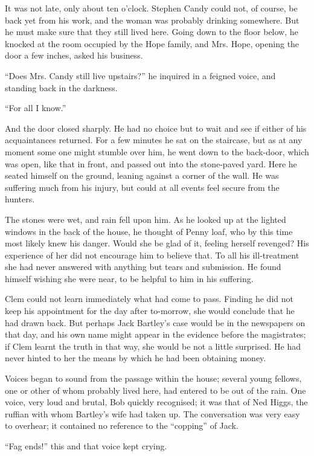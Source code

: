 It was not late, only about ten o'clock. Stephen Candy could not, of
course, be back yet from his work, and the woman was probably drinking
somewhere. But he must make sure that they still lived here. Going down
to the floor below, he knocked at the room occupied by the Hope family,
and Mrs. Hope, opening the door a few inches, asked his business.

``Does Mrs. Candy still live upstairs?'' he inquired in a feigned voice,
and standing back in the darkness.

{}``For all I know.''

And the door closed sharply. He had no choice but to wait and see if
either of his acquaintances returned. For a few minutes he sat on the
staircase, but as at any moment some one might stumble over him, he went
down to the back-door, which was open, like that in front, and passed
out into the stone-paved yard. Here he seated himself on the ground,
leaning against a corner of the wall. He was suffering much from his
injury, but could at all events feel secure from the hunters.

The stones were wet, and rain fell upon him. As he looked up at the
lighted windows in the back of the house, he thought of Penny loaf, who
by this time most likely knew his danger. Would she be glad of it,
feeling herself revenged? His experience of her did not encourage him to
believe that. To all his ill-treatment she had never answered with
anything but tears and submission. He found himself wishing she were
near, to be helpful to him in his suffering.

Clem could not learn immediately what had come to pass. Finding he did
not keep his {}appointment for the day after to-morrow, she would
conclude that he had drawn back. But perhaps Jack Bartley's case would
be in the newspapers on that day, and his own name might appear in the
evidence before the magistrates; if Clem learnt the truth in that way,
she would be not a little surprised. He had never hinted to her the
means by which he had been obtaining money.

Voices began to sound from the passage within the house; several young
fellows, one or other of whom probably lived here, had entered to be out
of the rain. One voice, very loud and brutal, Bob quickly recognised; it
was that of Ned Higgs, the ruffian with whom Bartley's wife had taken
up. The conversation was very easy to overhear; it contained no
reference to the ``copping'' of Jack.

``Fag ends!'' this and that voice kept crying.

